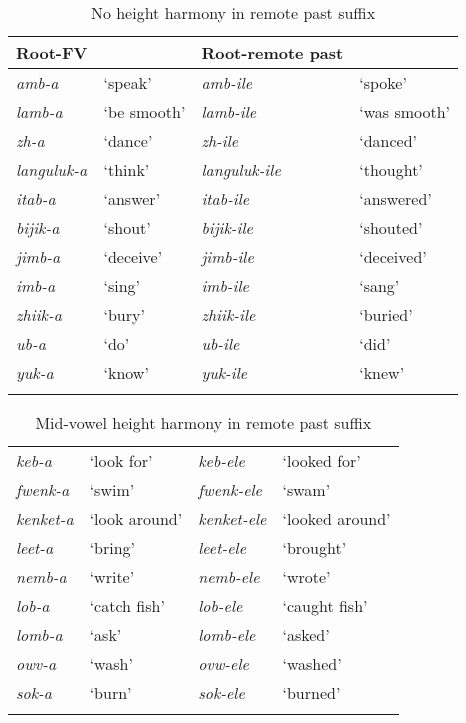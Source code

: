 \documentclass[output=paper]{langsci/langscibook}
\begin{document}
\begin{table}
\begin{tabularx}{\textwidth}{XXXX}
\lsptoprule
Root-FV & & Root-remote past & \\
\midrule
\textit{amb-a} & ‘speak’ & \textit{amb-ile} & ‘spoke’\\
\textit{lamb-a} & ‘be smooth’ & \textit{lamb-ile} & ‘was smooth’\\
\textit{zh-a} & ‘dance’ & \textit{zh-ile} & ‘danced’ \\
\textit{languluk-a } & ‘think’ &\textit{languluk-ile} & ‘thought’ \\
\textit{itab-a } & ‘answer’ &\textit{itab-ile } & ‘answered’ \\
\textit{bijik-a } & ‘shout’ & \textit{bijik-ile } & ‘shouted’ \\
\textit{jimb-a } & ‘deceive’ & \textit{jimb-ile } & ‘deceived’ \\
\textit{imb-a } & ‘sing’ & \textit{imb-ile } & ‘sang’ \\
\textit{zhiik-a } & ‘bury’ & \textit{zhiik-ile } & ‘buried’ \\
\textit{ub-a } & ‘do’ & \textit{ub-ile } & ‘did’ \\
\textit{yuk-a } & ‘know’ &\textit{yuk-ile } & ‘knew’ \\
\lspbottomrule
\end{tabularx}

\caption{No height harmony in remote past suffix}
\label{tab:2.kawasha}

 \end{table}



\begin{table}

\begin{tabularx}{\textwidth}{XXXX}
\lsptoprule
\textit{keb-a}   & ‘look for’    & \textit{keb-ele}    & ‘looked for’    \\
\textit{fwenk-a} & ‘swim’    & \textit{fwenk-ele}  & ‘swam’  \\
\textit{kenket-a}    & ‘look around’ & \textit{kenket-ele} & ‘looked around’ \\
\textit{leet-a}  & ‘bring’   & \textit{leet-ele}   & ‘brought’   \\
\textit{nemb-a}  & ‘write’   & \textit{nemb-ele}   & ‘wrote' \\
\textit{lob-a}   & ‘catch fish’  & \textit{lob-ele}    & ‘caught fish’   \\
\textit{lomb-a}  & ‘ask’ & \textit{lomb-ele}   & ‘asked’ \\
\textit{owv-a}   & ‘wash’    & \textit{ovw-ele}    & ‘washed’    \\
\textit{sok-a}   & ‘burn’    & \textit{sok-ele}    & ‘burned’    \\
\lspbottomrule
\end{tabularx}

\caption{ Mid-vowel height harmony in remote past suffix}
\label{tab:3.kawasha}

 \end{table}
\end{document}
